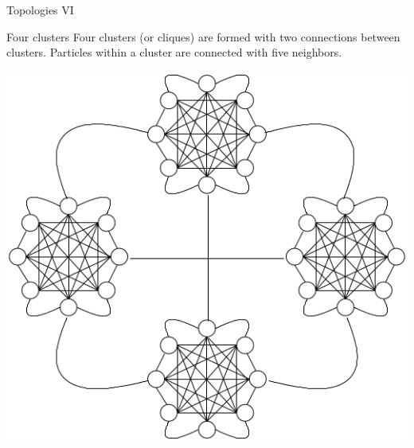 \documentclass[aspectratio=169,compress,10pt]{beamer}
\begin{document}
\begin{frame}{Topologies VI}
\begin{block}{Four clusters}
Four clusters (or cliques) are formed with two connections between clusters.
Particles within a cluster are connected with five neighbors.

\centering
\includegraphics[scale=0.25]{../resources/four-clusters}
\end{block}
\end{frame}
\end{document}
